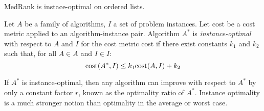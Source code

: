 \begin{property}
    MedRank is instace-optimal on ordered lists.
\end{property}
\begin{definition}
    Let $A$ be a family of algorithms, $I$ a set of problem instances. 
    Let cost be a cost metric applied to an algorithm-instance pair. 
    Algorithm $A^{*}$ is \emph{instance-optimal} with respect to $A$ and $I$ for the cost metric cost if there exist constants $k_1$ and $k_2$ such that, for all $A \in A$ and $I \in I$: 
    \[\textnormal{cost}(A^{*}, I) \leq k_1 \textnormal{cost}(A, I) + k_2\]
\end{definition}
If $A^{*}$ is instance-optimal, then any algorithm can improve with respect to $A^{*}$ by only a constant factor $r$, known as the optimality ratio of $A^{*}$.
Instance optimality is a much stronger notion than optimality in the average or worst case.